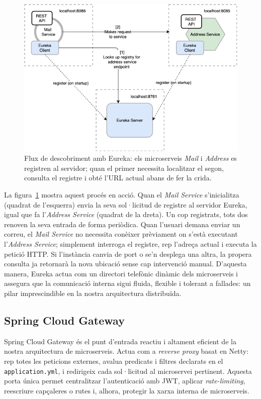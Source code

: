 \begin{figure}[H]
  \centering
  \includegraphics[width=0.85\linewidth]{Figures/netflix-eureka-service-discovery.png}
  \caption{Flux de descobriment amb Eureka: els microserveis \emph{Mail} i \emph{Address} es registren al servidor; quan el primer necessita localitzar el segon, consulta el registre i obté l'URL actual abans de fer la crida.}
  \label{fig:eureka-flow}
\end{figure}

La figura~\ref{fig:eureka-flow} mostra aquest procés en acció. Quan el \emph{Mail Service} s'inicialitza (quadrat de l'esquerra) envia la seva sol·licitud de registre al servidor Eureka, igual que fa l'\emph{Address Service} (quadrat de la dreta). Un cop registrats, tots dos renoven la seva entrada de forma periòdica. Quan l'usuari demana enviar un correu, el \emph{Mail Service} no necessita conèixer prèviament on s'està executant l'\emph{Address Service}; simplement interroga el registre, rep l'adreça actual i executa la petició HTTP. Si l'instància canvia de port o se'n desplega una altra, la propera consulta ja retornarà la nova ubicació sense cap intervenció manual. D'aquesta manera, Eureka actua com un directori telefònic dinàmic dels microserveis i assegura que la comunicació interna sigui fluida, flexible i tolerant a fallades: un pilar imprescindible en la nostra arquitectura distribuïda.

\subsection*{Spring Cloud Gateway}

Spring Cloud Gateway és el punt d'entrada reactiu i altament eficient de la nostra arquitectura de microserveis.  
Actua com a \emph{reverse proxy} basat en Netty: rep totes les peticions externes, avalua predicats i filtres declarats en el \texttt{application.yml}, i redirigeix cada sol·licitud al microservei pertinent.  
Aquesta porta única permet centralitzar l'autenticació amb JWT, aplicar \emph{rate-limiting}, reescriure capçaleres o rutes i, alhora, protegir la xarxa interna de microserveis.

